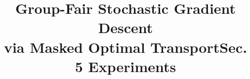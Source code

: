 \documentclass{article}
\title{Group-Fair Stochastic Gradient Descent \\ via Masked Optimal Transport}
\title{Sec. 5 Experiments}
\theoremstyle{definition}
\begin{document}
\ninept\maketitle

\end{document}
